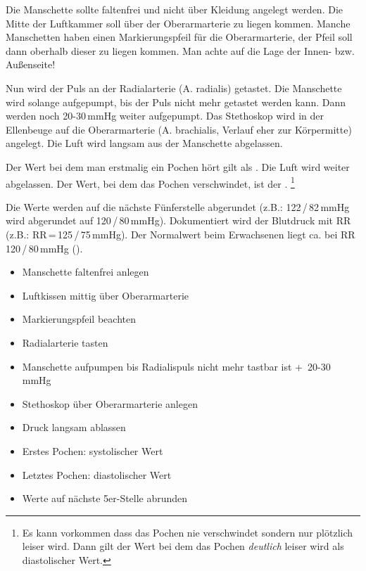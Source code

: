 {
Die Manschette sollte faltenfrei und nicht über Kleidung angelegt werden. Die
Mitte der Luftkammer soll über der Oberarmarterie zu liegen kommen. Manche
Manschetten haben einen Markierungspfeil für die Oberarmarterie, der Pfeil soll
dann oberhalb dieser zu liegen kommen. Man achte auf die Lage der Innen- bzw.
Außenseite!

Nun wird
der Puls an der Radialarterie (A. radialis) getastet. Die Manschette wird
solange aufgepumpt, bis der Puls nicht mehr getastet werden kann. Dann werden
noch 20-30\,mmHg weiter aufgepumpt. Das Stethoskop wird in der Ellenbeuge auf
die Oberarmarterie (A. brachialis, Verlauf eher zur Körpermitte) angelegt. Die
Luft wird langsam aus der Manschette abgelassen. 

Der Wert bei dem man
erstmalig ein Pochen  hört gilt als
. Die Luft wird weiter abgelassen. Der Wert, bei dem das
Pochen verschwindet, ist der . \footnote{Es kann
vorkommen dass das Pochen nie verschwindet sondern nur plötzlich leiser wird.
Dann gilt der Wert bei dem das Pochen \emph{deutlich} leiser wird als
diastolischer Wert.}

Die
Werte werden auf die nächste Fünferstelle abgerundet (z.B.:
122\,/\,82\,mmHg wird abgerundet auf 120\,/\,80\,mmHg). Dokumentiert
wird der Blutdruck mit RR (z.B.: RR\,=\,125\,/\,75\,mmHg). Der
Normalwert beim Erwachsenen liegt ca. bei RR 120\,/\,80\,mmHg
().
}{
\begin{itemize}
  \item Manschette faltenfrei anlegen
  \item Luftkissen  mittig über Oberarmarterie
  \item Markierungspfeil beachten
  \item Radialarterie tasten
  \item Manschette aufpumpen bis Radialispuls nicht mehr tastbar ist
  +~20-30\,mmHg
  \item Stethoskop über Oberarmarterie anlegen
  \item Druck langsam ablassen
  \item Erstes Pochen: systolischer Wert
  \item Letztes Pochen: diastolischer Wert
  \item Werte auf nächste 5er-Stelle abrunden
\end{itemize}

}{}{}{}




